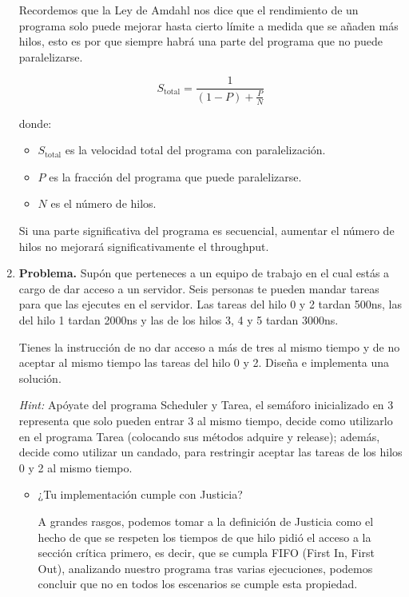 \begin{enumerate}
Recordemos que la Ley de Amdahl nos dice que el rendimiento de un programa solo puede mejorar hasta cierto límite a medida que se añaden más hilos, esto es por que siempre habrá una parte del programa que no puede paralelizarse.

\[
S_{\text{total}} = \frac{1}{(1 - P) + \frac{P}{N}}
\]

donde:
\begin{itemize}
    \item \(S_{\text{total}}\) es la velocidad total del programa con paralelización.
    \item \(P\) es la fracción del programa que puede paralelizarse.
    \item \(N\) es el número de hilos.
\end{itemize}

Si una parte significativa del programa es secuencial, aumentar el número de hilos no mejorará significativamente el throughput.

\hfill

\item \textbf{Problema.} Supón que perteneces a un equipo de trabajo en el cual estás a cargo de dar acceso a un servidor. Seis personas te pueden mandar tareas para que las ejecutes en el servidor. Las tareas del hilo 0 y 2 tardan 500ns, las del hilo 1 tardan 2000ns y las de los hilos 3, 4 y 5 tardan 3000ns.

Tienes la instrucción de no dar acceso a más de tres al mismo tiempo y de no aceptar al mismo tiempo las tareas del hilo 0 y 2. Diseña e implementa una solución. 

\textit{Hint:} Apóyate del programa Scheduler y Tarea, el semáforo inicializado en 3 representa que solo pueden entrar 3 al mismo tiempo, decide como utilizarlo en el programa Tarea (colocando sus métodos adquire y release); además, decide como utilizar un candado, para restringir aceptar las tareas de los hilos 0 y 2 al mismo tiempo.

\begin{itemize}
    \item ¿Tu implementación cumple con Justicia?

    A grandes rasgos, podemos tomar a la definición de Justicia como el hecho de que se respeten los tiempos de que hilo pidió el acceso a la sección crítica primero, es decir, que se cumpla FIFO (First In, First Out), analizando nuestro programa tras varias ejecuciones, podemos concluir que no en todos los escenarios se cumple esta propiedad.
    

\end{itemize}
\end{enumerate}
